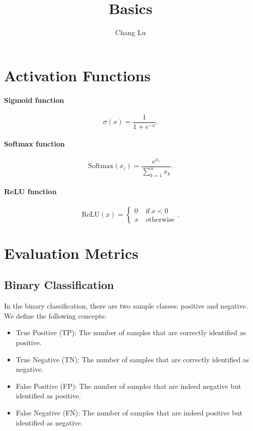 \documentclass{article}
\title{Basics}
\author{Chang Lu}
\begin{document}
\maketitle

\section{Activation Functions}
\paragraph{Sigmoid function}
\begin{equation}
    \sigma\left(x\right) = \frac{1}{1 + e^{-x}}.
\end{equation}

\paragraph{Softmax function}
\begin{equation}
    \text{Softmax}\left(x_i\right) = \frac{e^{x_i}}{\sum_{k=1}^{n}{x_k}}.
\end{equation}

\paragraph{ReLU function}
\begin{equation}
    \text{ReLU}\left(x\right) = \begin{cases}
        0 &~\text{if}~x < 0 \\
        x &~\text{otherwise}
    \end{cases}.
\end{equation}

\section{Evaluation Metrics}
\subsection{Binary Classification}
In the binary classification, there are two sample classes: positive and negative. We define the following concepts:
\begin{itemize}
    \item True Positive (TP): The number of samples that are correctly identified as positive.
    \item True Negative (TN): The number of samples that are correctly identified as negative.
    \item False Positive (FP): The number of samples that are indeed negative but identified as positive.
    \item False Negative (FN): The number of samples that are indeed positive but identified as negative.
\end{itemize}
\end{document}
